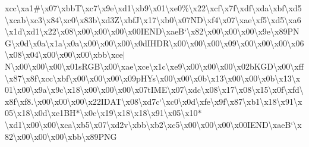 {}xcc\textbackslash{}xa1\#\textbackslash{}x07\textbackslash{}xbb\+T\textbackslash{}xc7\textbackslash{}x9e\textbackslash{}xd1\textbackslash{}xb9\textbackslash{}x01\textbackslash{}xe0\%\textbackslash{}x22\textbackslash{}xcf\textbackslash{}x7f\textbackslash{}xdf\textbackslash{}xda\textbackslash{}xbf\textbackslash{}xd5\textbackslash{}xcab\textbackslash{}xc3\textbackslash{}x84\textbackslash{}xc0\textbackslash{}x83b\textbackslash{}xd3\+Z\textbackslash{}xbf\+J\textbackslash{}x17\textbackslash{}xb0\textbackslash{}x07\+N\+D\textbackslash{}xf4\textbackslash{}x07\textbackslash{}xae\textbackslash{}xf5\textbackslash{}xd5\textbackslash{}xa6\textbackslash{}x1d\textbackslash{}xd1\textbackslash{}x22\textbackslash{}x08\textbackslash{}x00\textbackslash{}x00\textbackslash{}x00\textbackslash{}x00\+I\+E\+N\+D\textbackslash{}xae\+B`\textbackslash{}x82\textbackslash{}x00\textbackslash{}x00\textbackslash{}x00\textbackslash{}x9e\textbackslash{}x89\+P\+N\+G\textbackslash{}x0d\textbackslash{}x0a\textbackslash{}x1a\textbackslash{}x0a\textbackslash{}x00\textbackslash{}x00\textbackslash{}x00\textbackslash{}x0d\+I\+H\+D\+R\textbackslash{}x00\textbackslash{}x00\textbackslash{}x00\textbackslash{}x09\textbackslash{}x00\textbackslash{}x00\textbackslash{}x00\textbackslash{}x06\textbackslash{}x08\textbackslash{}x04\textbackslash{}x00\textbackslash{}x00\textbackslash{}x00\textbackslash{}xbb\textbackslash{}xce$\vert$\+N\textbackslash{}x00\textbackslash{}x00\textbackslash{}x00\textbackslash{}x01s\+R\+G\+B\textbackslash{}x00\textbackslash{}xae\textbackslash{}xce\textbackslash{}x1c\textbackslash{}xe9\textbackslash{}x00\textbackslash{}x00\textbackslash{}x00\textbackslash{}x02b\+K\+G\+D\textbackslash{}x00\textbackslash{}xff\textbackslash{}x87\textbackslash{}x8f\textbackslash{}xcc\textbackslash{}xbf\textbackslash{}x00\textbackslash{}x00\textbackslash{}x00\textbackslash{}x09p\+H\+Ys\textbackslash{}x00\textbackslash{}x00\textbackslash{}x0b\textbackslash{}x13\textbackslash{}x00\textbackslash{}x00\textbackslash{}x0b\textbackslash{}x13\textbackslash{}x01\textbackslash{}x00\textbackslash{}x9a\textbackslash{}x9c\textbackslash{}x18\textbackslash{}x00\textbackslash{}x00\textbackslash{}x00\textbackslash{}x07t\+I\+M\+E\textbackslash{}x07\textbackslash{}xdc\textbackslash{}x08\textbackslash{}x17\textbackslash{}x08\textbackslash{}x15\textbackslash{}x0f\textbackslash{}xfd\textbackslash{}x8f\textbackslash{}xf8.\textbackslash{}x00\textbackslash{}x00\textbackslash{}x00\textbackslash{}x22\+I\+D\+A\+T\textbackslash{}x08\textbackslash{}xd7c`\textbackslash{}xc0\textbackslash{}x0d\textbackslash{}xfe\textbackslash{}x9f\textbackslash{}x87\textbackslash{}xb1\textbackslash{}x18\textbackslash{}x91\textbackslash{}x05\textbackslash{}x18\textbackslash{}x0d\textbackslash{}xe1\+B\+H$\ast$\textbackslash{}x0c\textbackslash{}x19\textbackslash{}x18\textbackslash{}x18\textbackslash{}x91\textbackslash{}x05\textbackslash{}x10$\ast$\textbackslash{}xd1\textbackslash{}x00\textbackslash{}x00\textbackslash{}xca\textbackslash{}xb5\textbackslash{}x07\textbackslash{}xd2v\textbackslash{}xbb\textbackslash{}xb2\textbackslash{}xc5\textbackslash{}x00\textbackslash{}x00\textbackslash{}x00\textbackslash{}x00\+I\+E\+N\+D\textbackslash{}xae\+B`\textbackslash{}x82\textbackslash{}x00\textbackslash{}x00\textbackslash{}x00\textbackslash{}xbb\textbackslash{}x89\+P\+N\+G\textbacksla